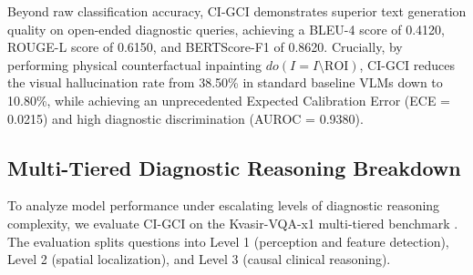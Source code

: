 \documentclass[journal,twoside,web]{ieeecolor}
\begin{document}
\begin{table}[t]
\caption{Main Comparison on Standard Med-VQA Datasets}
\label{tab:main_comparison}
\centering
\setlength{\tabcolsep}{3pt}
\end{table}

Beyond raw classification accuracy, CI-GCI demonstrates superior text generation quality on open-ended diagnostic queries, achieving a BLEU-4 score of 0.4120, ROUGE-L score of 0.6150, and BERTScore-F1 of 0.8620. Crucially, by performing physical counterfactual inpainting $do(I = I \setminus \text{ROI})$, CI-GCI reduces the visual hallucination rate from 38.50\% in standard baseline VLMs down to 10.80\%, while achieving an unprecedented Expected Calibration Error (ECE = 0.0215) and high diagnostic discrimination (AUROC = 0.9380).

\subsection{Multi-Tiered Diagnostic Reasoning Breakdown}
To analyze model performance under escalating levels of diagnostic reasoning complexity, we evaluate CI-GCI on the Kvasir-VQA-x1 multi-tiered benchmark \cite{jha2023}. The evaluation splits questions into Level 1 (perception and feature detection), Level 2 (spatial localization), and Level 3 (causal clinical reasoning).
\end{document}
